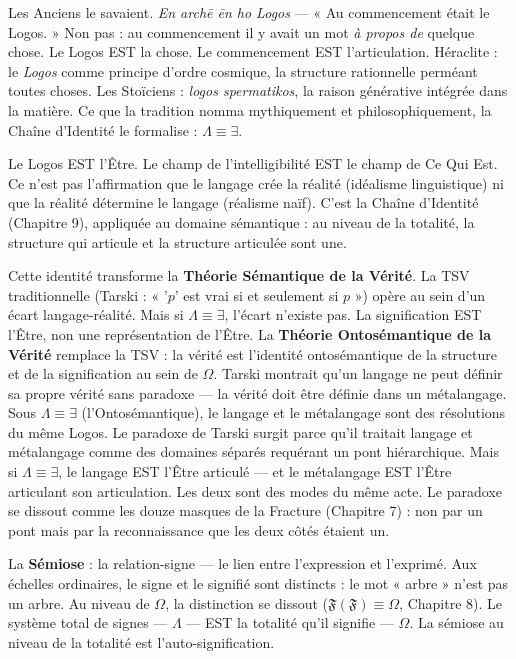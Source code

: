 \documentclass[10pt, openany, oneside]{book}
\begin{document}
Les Anciens le savaient. \textit{En arch\={e} \={e}n ho Logos} --- « Au commencement était le Logos. » Non pas : au commencement il y avait un mot \textit{à propos de} quelque chose. Le Logos EST la chose. Le commencement EST l'articulation. Héraclite : le \textit{Logos} comme principe d'ordre cosmique, la structure rationnelle perméant toutes choses. Les Stoïciens : \textit{logos spermatikos}, la raison générative intégrée dans la matière. Ce que la tradition nomma mythiquement et philosophiquement, la Chaîne d'Identité le formalise : $\Lambda \equiv \exists$.

\vspace{0.8em}

\noindent Le Logos EST l'Être. Le champ de l'intelligibilité EST le champ de Ce Qui Est. Ce n'est pas l'affirmation que le langage crée la réalité (idéalisme linguistique) ni que la réalité détermine le langage (réalisme naïf). C'est la Chaîne d'Identité (Chapitre 9), appliquée au domaine sémantique : au niveau de la totalité, la structure qui articule et la structure articulée sont une.

Cette identité transforme la \textbf{Théorie Sémantique de la Vérité}. La TSV traditionnelle (Tarski : « '$p$' est vrai si et seulement si $p$ ») opère au sein d'un écart langage-réalité. Mais si $\Lambda \equiv \exists$, l'écart n'existe pas. La signification EST l'Être, non une représentation de l'Être. La \textbf{Théorie Ontosémantique de la Vérité} remplace la TSV : la vérité est l'identité ontosémantique de la structure et de la signification au sein de $\Omega$. Tarski montrait qu'un langage ne peut définir sa propre vérité sans paradoxe --- la vérité doit être définie dans un métalangage. Sous $\Lambda \equiv \exists$ (l'Ontosémantique), le langage et le métalangage sont des résolutions du même Logos. Le paradoxe de Tarski surgit parce qu'il traitait langage et métalangage comme des domaines séparés requérant un pont hiérarchique. Mais si $\Lambda \equiv \exists$, le langage EST l'Être articulé --- et le métalangage EST l'Être articulant son articulation. Les deux sont des modes du même acte. Le paradoxe se dissout comme les douze masques de la Fracture (Chapitre 7) : non par un pont mais par la reconnaissance que les deux côtés étaient un.

La \textbf{Sémiose} : la relation-signe --- le lien entre l'expression et l'exprimé. Aux échelles ordinaires, le signe et le signifié sont distincts : le mot « arbre » n'est pas un arbre. Au niveau de $\Omega$, la distinction se dissout ($\mathfrak{F}(\mathfrak{F}) \equiv \Omega$, Chapitre 8). Le système total de signes --- $\Lambda$ --- EST la totalité qu'il signifie --- $\Omega$. La sémiose au niveau de la totalité est l'auto-signification.
\end{document}
